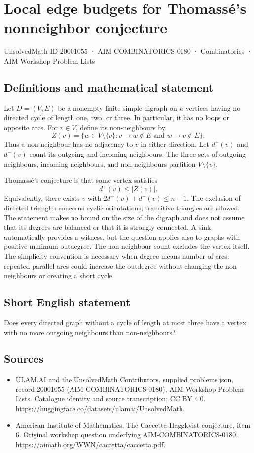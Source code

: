\documentclass[11pt,a4paper]{article}
\begin{document}
\section*{Local edge budgets for Thomassé's nonneighbor conjecture}\label{20001055}
{\small UnsolvedMath ID 20001055 · AIM-COMBINATORICS-0180 · Combinatorics · AIM Workshop Problem Lists}
\subsection{Definitions and mathematical statement}
Let $D=(V,E)$ be a nonempty finite simple digraph on $n$ vertices
having no directed cycle of length one, two, or three. In particular,
it has no loops or opposite arcs. For $v\in V$, define its non-neighbours
by
\[
 Z(v)=\{w\in V\setminus\{v\}:v\to w\notin E
                                      \text{ and }w\to v\notin E\}.
\]
Thus a non-neighbour has no adjacency to $v$ in either direction.
Let $d^+(v)$ and $d^-(v)$ count its outgoing and incoming neighbours.
The three sets of outgoing neighbours, incoming neighbours, and
non-neighbours partition $V\setminus\{v\}$.

Thomass\'e's conjecture is that some vertex satisfies
\[
                             d^+(v)\le |Z(v)|.
\]
Equivalently, there exists $v$ with
$2d^+(v)+d^-(v)\le n-1$.
The exclusion of directed triangles concerns cyclic orientations;
transitive triangles are allowed. The statement makes no bound on
the size of the digraph and does not assume that its degrees are
balanced or that it is strongly connected.
A sink automatically provides a witness, but the question applies
also to graphs with positive minimum outdegree. The non-neighbour
count excludes the vertex itself. The simplicity convention is
necessary when degree means number of arcs: repeated parallel arcs
could increase the outdegree without changing the non-neighbours or
creating a short cycle.
\subsection{Short English statement}
Does every directed graph without a cycle of length at most three have a vertex with no more outgoing neighbours than non-neighbours?
\subsection{Sources}
\begin{itemize}
\item[S1] ULAM.AI and the UnsolvedMath Contributors, supplied problems.json, record 20001055 (AIM-COMBINATORICS-0180), AIM Workshop Problem Lists. Catalogue identity and source transcription; CC BY 4.0.
\url{https://huggingface.co/datasets/ulamai/UnsolvedMath}.
\item[S2] American Institute of Mathematics, The Caccetta-Haggkvist conjecture, item 6. Original workshop question underlying AIM-COMBINATORICS-0180.
\url{https://aimath.org/WWN/caccetta/caccetta.pdf}.
\end{itemize}
\end{document}
